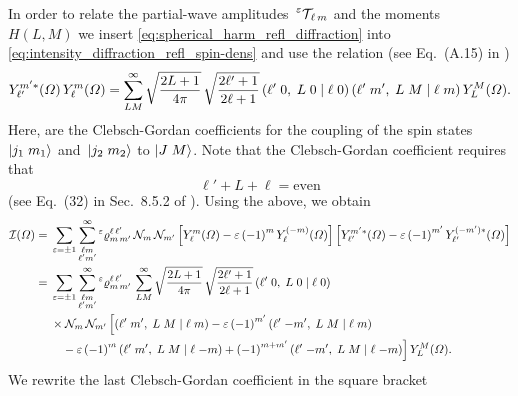 In order to relate the partial-wave
amplitudes~$\prescript{\ensuremath{\varepsilon}}{}{\mathcal{T\!}}_{\ell\, m}$ and the
moments~$H(L, M)$ we insert \cref{eq:spherical_harm_refl_diffraction}
into \cref{eq:intensity_diffraction_refl_spin-dens} and use the
relation (see Eq.~(A.15) in )
\begin{equation}
  Y_{\ell'}^{m' *}(\Omega)\, Y_{\ell}^m(\Omega)
  = \sum_{L M}^\infty \sqrt{\frac{2 L + 1}{4 \pi}}\, \sqrt{\frac{2 \ell' + 1}{2 \ell + 1}}\, ({\ell'}\;{0},\;{L}\;{0}\; |\; {\ell}\;{0})\, ({\ell'}\;{m'},\;{L}\;{M}\; |\; {\ell}\;{m})\, Y_L^M(\Omega).
\end{equation}
Here,  are the Clebsch-Gordan
coefficients for the coupling of the spin states $\ket{j_1\; m_1}$
and~$\ket{j_2\; m_2}$ to $\ket{J\; M}$.  Note that the Clebsch-Gordan
coefficient  requires that
\begin{equation}
  \label{eq:ang_mom_sum}
  \ell' + L + \ell
  = \text{even}
\end{equation}
(see Eq.~(32) in Sec.~8.5.2 of ).  Using
the above, we obtain
\begin{align}
  \mathcal{I}(\Omega)
  ={}&
    \sum_{\refl = \pm 1} \sum_{\substack{\ell m \\ \ell' m'}}^\infty
    \prescript{\refl}{}{\varrho}^{\ell\, \ell'}_{m\, m'}\,
    \mathcal{N}_m\, \mathcal{N}_{m'}
    \sBrk[2]{Y_\ell^m(\Omega) - \refl\, {(-1)}^m\, Y_\ell^{(-m)}(\Omega)}
    \sBrk[2]{Y_{\ell'}^{m' *}(\Omega) - \refl\, {(-1)}^{m'}\, Y_{\ell'}^{(-m') *}(\Omega)}
  \\
  ={}& \begin{multlined}[t][0.85\columnwidth]
    \sum_{\refl = \pm 1} \sum_{\substack{\ell m \\ \ell' m'}}^\infty
    \prescript{\refl}{}{\varrho}^{\ell\, \ell'}_{m\, m'}\,
    \sum_{L M}^\infty \sqrt{\frac{2 L + 1}{4 \pi}}\, \sqrt{\frac{2 \ell' + 1}{2 \ell + 1}}\, \clebsch{\ell'}{0}{L}{0}{\ell}{0} \\
    \shoveleft{\times \mathcal{N}_m\, \mathcal{N}_{m'}\, \Big[ \clebsch{\ell'}{m'}{L}{M}{\ell}{m}                       - \refl\, {(-1)}^{m'}\, \clebsch{\ell'}{-m'}{L}{M}{\ell}{m}} \\
      - \refl\, {(-1)}^m\, \clebsch{\ell'}{m'}{L}{M}{\ell}{-m} + {(-1)}^{m + m'}\, \clebsch{\ell'}{-m'}{L}{M}{\ell}{-m} \Big]\,
    Y_L^M(\Omega).
  \end{multlined}
\end{align}
We rewrite the last Clebsch-Gordan coefficient in the square bracket
